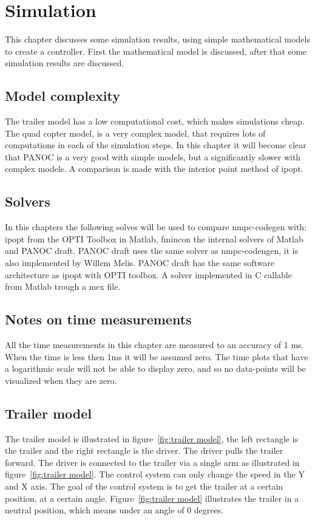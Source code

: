\chapter{Simulation}
This chapter discusses some simulation results, using simple mathematical models to create a controller. First the mathematical model is discussed, after that some simulation results are discussed.

\section{Model complexity}
The trailer model has a low computational cost, which makes simulations cheap. The quad copter model, is a very complex model, that requires lots of computations in each of the simulation steps. In this chapter it will become clear that PANOC is a very good with simple models, but a significantly slower with complex models. A comparison is made with the interior point method of ipopt.

\section{Solvers}
In this chapters the following solves will be used to compare nmpc-codegen with:
ipopt from the OPTI Toolbox in Matlab, fmincon the internal solvers of Matlab and PANOC draft. PANOC draft uses the same solver as nmpc-codengen, it is also implemented by Willem Melis. PANOC draft has the same software architecture as ipopt with OPTI toolbox. A solver implemented in C callable from Matlab trough a mex file.

\section{Notes on time measurements}
All the time measurements in this chapter are measured to an accuracy of 1 ms. When the time is less then 1ms it will be assumed zero. The time plots that have a logarithmic scale will not be able to display zero, and so no data-points will be visualized when they are zero.

\section{Trailer model}
The trailer model is illustrated in figure~\ref{fig:trailer model}, the left rectangle is the trailer and the right rectangle is the driver. The driver pulls the trailer forward. The driver is connected to the trailer via a single arm as illustrated in figure~\ref{fig:trailer model}. The control system can only change the speed in the Y and X axis. The goal of the control system is to get the trailer at a certain position, at a certain angle. Figure~\ref{fig:trailer model} illustrates the trailer in a neutral position, which means under an angle of 0 degrees.

